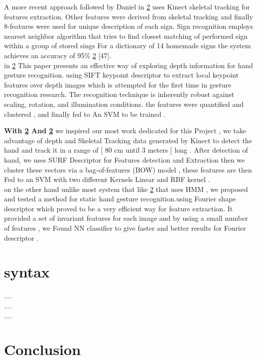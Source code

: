 A more recent approach followed by Daniel in \ref{} uses Kinect skeletal tracking for features extraction. Other features were derived from skeletal tracking and finally 8-features were used for unique description of each sign. Sign recognition employs nearest neighbor algorithm that tries to find closest matching of performed sign within a group of stored sings  For a dictionary of 14 homemade signs the system achieves an accuracy of 95\% \ref{} [47].  \\

in \ref{} This paper presents an effective way of exploring depth information for hand gesture recognition. using  SIFT keypoint descriptor to extract local keypoint features
over depth images which is attempted for the first time in gesture recognition research. The recognition technique is inherently robust against scaling, rotation, and illumination conditions.  the features were  quantified  and clustered , and finally fed to  An SVM to be trained .\\




\textbf{With \ref{} And \ref{} } we inspired our most work dedicated for this Project , we take advantage of  depth and Skeletal Tracking  data generated by Kinect to detect the hand and track it  in a range of [ 80 cm until 3 meters ] long  .
After detection of hand, we uses SURF Descriptor for Features detection and Extraction then we  cluster these vectors via a bag-of-features (BOW) model , these features are then Fed to an SVM with two different Kernels Linear and RBF kernel .\\

on the other hand unlike most system that like \ref{} that uses HMM ,  we proposed and tested a method for static hand gesture recognition.using  Fourier shape  descriptor which proved to be a very efficient way for feature extraction. It provided a set of invariant features for each image and by using a small number of features , we Found NN classifier to give faster and better results for Fourier descriptor .


\section{syntax}

....
\\
....
\\
....



\section{Conclusion}
